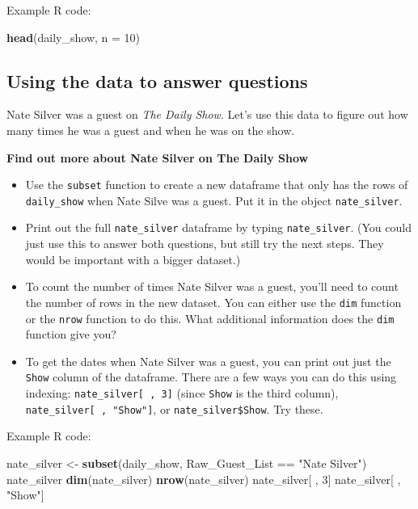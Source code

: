 \documentclass[]{book}
\makeatletter
\newenvironment{Shaded}{\begin{snugshade}}{\end{snugshade}}
\newcommand{\KeywordTok}[1]{\textcolor[rgb]{0.13,0.29,0.53}{\textbf{{#1}}}}
\newcommand{\DataTypeTok}[1]{\textcolor[rgb]{0.13,0.29,0.53}{{#1}}}
\newcommand{\DecValTok}[1]{\textcolor[rgb]{0.00,0.00,0.81}{{#1}}}
\newcommand{\StringTok}[1]{\textcolor[rgb]{0.31,0.60,0.02}{{#1}}}
\newcommand{\NormalTok}[1]{{#1}}
\providecommand{\tightlist}{%
  \setlength{\itemsep}{0pt}\setlength{\parskip}{0pt}}
\newenvironment{kframe}{%
\medskip{}
\setlength{\fboxsep}{.8em}
 \def\at@end@of@kframe{}%
 \ifinner\ifhmode%
  \def\at@end@of@kframe{\end{minipage}}%
  \begin{minipage}{\columnwidth}%
 \fi\fi%
 \def\FrameCommand##1{\hskip\@totalleftmargin \hskip-\fboxsep
 \colorbox{shadecolor}{##1}\hskip-\fboxsep
     \hskip-\linewidth \hskip-\@totalleftmargin \hskip\columnwidth}%
 \MakeFramed {\advance\hsize-\width
   \@totalleftmargin\z@ \linewidth\hsize
   \@setminipage}}%
 {\par\unskip\endMakeFramed%
 \at@end@of@kframe}
\renewenvironment{Shaded}{\begin{kframe}}{\end{kframe}}
\makeatother
\begin{document}
Example R code:

\begin{Shaded}
\begin{Highlighting}[]
\KeywordTok{head}\NormalTok{(daily_show, }\DataTypeTok{n =} \DecValTok{10}\NormalTok{)}
\end{Highlighting}
\end{Shaded}

\subsection{Using the data to answer
questions}\label{using-the-data-to-answer-questions}

Nate Silver was a guest on \emph{The Daily Show}. Let's use this data to
figure out how many times he was a guest and when he was on the show.

\textbf{Find out more about Nate Silver on The Daily Show}

\begin{itemize}
\tightlist
\item
  Use the \texttt{subset} function to create a new dataframe that only
  has the rows of \texttt{daily\_show} when Nate Silve was a guest. Put
  it in the object \texttt{nate\_silver}.
\item
  Print out the full \texttt{nate\_silver} dataframe by typing
  \texttt{nate\_silver}. (You could just use this to answer both
  questions, but still try the next steps. They would be important with
  a bigger dataset.)
\item
  To count the number of times Nate Silver was a guest, you'll need to
  count the number of rows in the new dataset. You can either use the
  \texttt{dim} function or the \texttt{nrow} function to do this. What
  additional information does the \texttt{dim} function give you?
\item
  To get the dates when Nate Silver was a guest, you can print out just
  the \texttt{Show} column of the dataframe. There are a few ways you
  can do this using indexing: \texttt{nate\_silver{[}\ ,\ 3{]}} (since
  \texttt{Show} is the third column),
  \texttt{nate\_silver{[}\ ,\ "Show"{]}}, or
  \texttt{nate\_silver\$Show}. Try these.
\end{itemize}

Example R code:

\begin{Shaded}
\begin{Highlighting}[]
\NormalTok{nate_silver <-}\StringTok{ }\KeywordTok{subset}\NormalTok{(daily_show, }
                      \NormalTok{Raw_Guest_List ==}\StringTok{ "Nate Silver"}\NormalTok{)}
\NormalTok{nate_silver}
\KeywordTok{dim}\NormalTok{(nate_silver)}
\KeywordTok{nrow}\NormalTok{(nate_silver)}
\NormalTok{nate_silver[ , }\DecValTok{3}\NormalTok{]}
\NormalTok{nate_silver[ , }\StringTok{"Show"}\NormalTok{]}
\end{Highlighting}
\end{Shaded}
\end{document}
